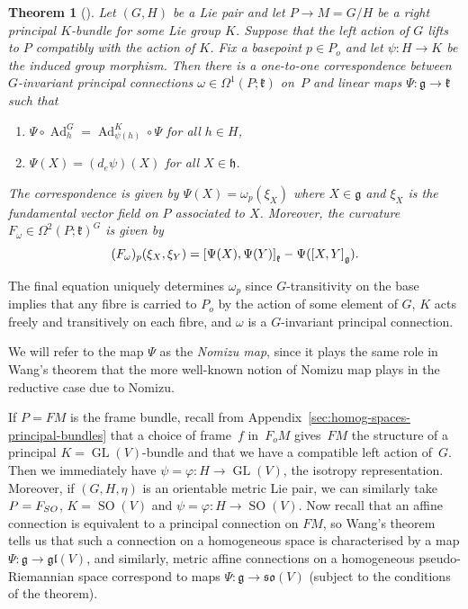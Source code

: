 \documentclass[11pt]{article}
\numberwithin{equation}{section}
\numberwithin{equation}{section}
\newtheorem{Theorem}{Theorem}[section]
\newcommand{\fg}{\mathfrak{g}}
\newcommand{\fh}{\mathfrak{h}}
\newcommand{\fk}{\mathfrak{k}}
\newcommand{\fgl}{\mathfrak{gl}}
\newcommand{\fso}{\mathfrak{so}}
\newcommand{\1}{\mathbbm{1}}
\DeclareMathOperator{\GL}{GL}
\DeclareMathOperator{\SO}{SO}
\DeclareMathOperator{\Ad}{Ad}
\begin{document}
\begin{Theorem}[\cite{Wang1958}]\label{thm:Wang}
	Let $(G,H)$ be a Lie pair and let $P\to M=G/H$ be a right principal $K$-bundle for some Lie group $K$. Suppose that the left action of $G$ lifts to $P$ compatibly with the action of $K$. Fix a basepoint $p\in P_o$ and let $\psi\colon H\to K$ be the induced group morphism. Then there is a one-to-one correspondence between~$G$-invariant principal connections $\omega\in\Omega^1(P;\fk)$ on~$P$ and linear maps $\Psi\colon \fg\to\fk$ such that
	\begin{enumerate}\itemsep=0pt
		\item[$(1)$] $\Psi\circ\Ad^G_h = \Ad^K_{\psi(h)}\circ\Psi$ for all $h\in H$,
		\item[$(2)$] $\Psi(X)=(d_e\psi)(X)$ for all $X\in\fh$.
	\end{enumerate}
	The correspondence is given by
$\Psi(X) = \omega_p(\xi_X)
$
	where $X\in \fg$ and $\xi_X$ is the fundamental vector field on $P$ associated to $X$. Moreover, the curvature $F_\omega\in\Omega^2(P;\fk)^G$ is given by
	\[
(F_\omega)_p(\xi_X,\xi_Y) = \comm{\Psi(X)}{\Psi(Y)}_\fk - \Psi(\comm{X}{Y}_\fg).
	\]
\end{Theorem}

The final equation uniquely determines $\omega_p$ since $G$-transitivity on the base implies that any fibre is carried to $P_o$ by the action of some element of $G$, $K$ acts freely and transitively on each fibre, and $\omega$ is a $G$-invariant principal connection.

We will refer to the map $\Psi$ as the \emph{Nomizu map}, since it plays the same role in Wang's theorem that the more well-known notion of Nomizu map plays in the reductive case due to Nomizu.

If $P=FM$ is the frame bundle, recall from Appendix~\ref{sec:homog-spaces-principal-bundles} that a choice of frame~$f$ in~$F_oM$ gives~$FM$ the structure of a principal $K=\GL(V)$-bundle and that we have a compatible left action of~$G$. Then we immediately have $\psi=\varphi\colon H\to\GL(V)$, the isotropy representation. Moreover, if $(G,H,\eta)$ is an orientable metric Lie pair, we can similarly take $P=F_{\rm SO}$, ${K=\SO(V)}$ and $\psi=\varphi\colon H\to\SO(V)$. Now recall that an affine connection is equivalent to a principal connection on $FM$, so Wang's theorem tells us that such a connection on a homogeneous space is characterised by a map $\Psi\colon \fg\to\fgl(V)$, and similarly, metric affine connections on a homogeneous pseudo-Riemannian space correspond to maps $\Psi\colon \fg\to\fso(V)$ (subject to the conditions of the theorem).
\end{document}
